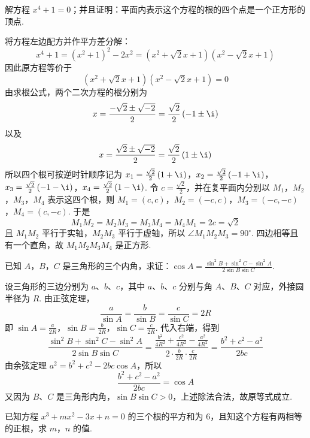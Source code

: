 \begin{problem}
解方程 \(x^4+1=0\)；并且证明：平面内表示这个方程的根的四个点是一个正方形的顶点.
\end{problem}

\begin{solution}
将方程左边配方并作平方差分解：
\[
x^4+1=\left( x^2+1 \right)^2-2x^2
=\left( x^2+\sqrt2x+1 \right)\left( x^2-\sqrt2x+1 \right)
\]
因此原方程等价于
\[
\left( x^2+\sqrt2x+1 \right)\left( x^2-\sqrt2x+1 \right)=0
\]
由求根公式，两个二次方程的根分别为
\[
x=\frac{-\sqrt2\pm\sqrt{-2}}{2}=\frac{\sqrt2}{2}\left( -1\pm\i \right)
\]
以及
\[
x=\frac{\sqrt2\pm\sqrt{-2}}{2}=\frac{\sqrt2}{2}\left( 1\pm\i \right)
\]
所以四个根可按逆时针顺序记为 \(x_1=\frac{\sqrt2}{2}\left( 1+\i \right)\)，\(x_2=\frac{\sqrt2}{2}\left( -1+\i \right)\)，\(x_3=\frac{\sqrt2}{2}\left( -1-\i \right)\)，\(x_4=\frac{\sqrt2}{2}\left( 1-\i \right)\).
令 \(c=\frac{\sqrt2}{2}\)，并在复平面内分别以 \(M_1\)，\(M_2\)，\(M_3\)，\(M_4\) 表示这四个根，则
\(M_1=(c,c)\)，\(M_2=(-c,c)\)，\(M_3=(-c,-c)\)，\(M_4=(c,-c)\).
于是
\[
M_1M_2=M_2M_3=M_3M_4=M_4M_1=2c=\sqrt2
\]
且 \(M_1M_2\) 平行于实轴，\(M_2M_3\) 平行于虚轴，所以 \(\angle M_1M_2M_3=90^\circ\). 四边相等且有一个直角，故 \(M_1M_2M_3M_4\) 是正方形.

\end{solution}

\begin{problem}
已知 \(A\)，\(B\)，\(C\) 是三角形的三个内角，求证：\(\cos A=\frac{\sin^2B+\sin^2C-\sin^2A}{2\sin B\sin C}\).
\end{problem}

\begin{solution}
设三角形的三边分别为 \(a\)、\(b\)、\(c\)，其中 \(a\)、\(b\)、\(c\) 分别与角 \(A\)、\(B\)、\(C\) 对应，外接圆半径为 \(R\). 由正弦定理，
\[
\frac{a}{\sin A}=\frac{b}{\sin B}=\frac{c}{\sin C}=2R
\]
即 \(\sin A=\frac{a}{2R}\)，\(\sin B=\frac{b}{2R}\)，\(\sin C=\frac{c}{2R}\).
代入右端，得到
\[
\frac{\sin^2B+\sin^2C-\sin^2A}{2\sin B\sin C}
=\frac{\frac{b^2}{4R^2}+\frac{c^2}{4R^2}-\frac{a^2}{4R^2}}{2\cdot\frac{b}{2R}\cdot\frac{c}{2R}}
=\frac{b^2+c^2-a^2}{2bc}
\]
由余弦定理 \(a^2=b^2+c^2-2bc\cos A\)，所以
\[
\frac{b^2+c^2-a^2}{2bc}=\cos A
\]
又因为 \(B\)、\(C\) 是三角形内角，\(\sin B\sin C>0\)，上述除法合法，故原等式成立.
\end{solution}

\begin{problem}
已知方程 \(x^3+mx^2-3x+n=0\) 的三个根的平方和为 \(6\)，且知这个方程有两相等的正根，求 \(m\)，\(n\) 的值.
\end{problem}

